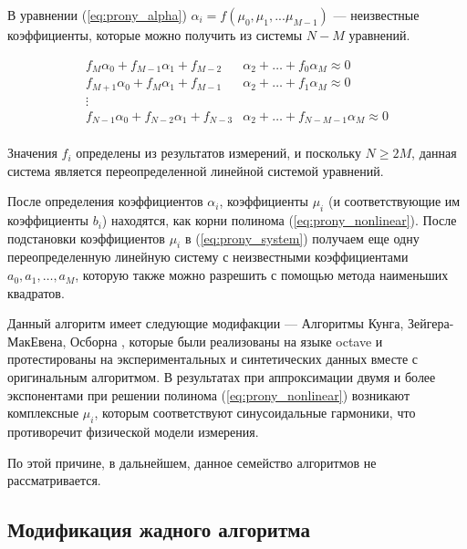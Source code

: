 В уравнении (\ref{eq:prony_alpha})  $\alpha_i = f (\mu_0, \mu_1, ... \mu_{M-1} )$  --- неизвестные коэффициенты, которые можно получить
 из системы $ N - M $ уравнений. 

\begin{equation}
  \begin{split}
  f_M \alpha_0 + f_{M-1} \alpha_1 + f_{M-2} & \alpha_2 + \ldots + f_0 \alpha_M \approx 0  \\
  f_{M+1} \alpha_0 + f_{M} \alpha_1 + f_{M-1} & \alpha_2 + \ldots + f_1 \alpha_M \approx 0 \\
  \vdots & \\
  f_{N-1} \alpha_0 + f_{N-2} \alpha_1 + f_{N-3} & \alpha_2 + \ldots + f_{N-M-1} \alpha_M \approx 0  \\
  \end{split}
  \label{eq:prony_system2}
\end{equation}

Значения $f_i$ определены из результатов измерений, и поскольку $N \geq 2M$, данная система является переопределенной линейной системой уравнений.

После определения коэффициентов $\alpha_i$, коэффициенты $\mu_i$ (и соответствующие им коэффициенты $b_i$) находятся, как корни полинома (\ref{eq:prony_nonlinear}). После подстановки коэффициентов $\mu_i$ в (\ref{eq:prony_system}) получаем еще одну переопределенную линейную систему с неизвестными коэффициентами $a_0, a_1, \ldots, a_M$, которую также можно разрешить с помощью метода наименьших квадратов.  


Данный алгоритм имеет следующие модифакции --- Алгоритмы Кунга, Зейгера-МакЕвена, Осборна \cite{kung, zeiger, osborn}, которые были реализованы на языке octave и протестированы на экспериментальных и синтетических данных вместе с оригинальным алгоритмом. В результатах при аппроксимации двумя и более экспонентами при решении полинома (\ref{eq:prony_nonlinear}) возникают комплексные $\mu_i$, которым соответствуют синусоидальные гармоники, что противоречит физической модели измерения. 

По этой причине, в дальнейшем, данное семейство алгоритмов не рассматривается.




\subsection{Модификация жадного алгоритма}\label{subsect2_3_4}

